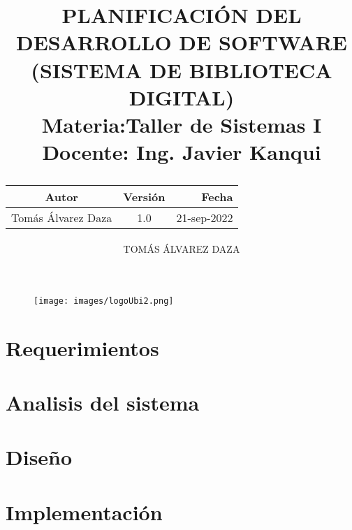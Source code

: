 \documentclass[10pt,letterpaper]{report}
\author{TOMÁS ÁLVAREZ DAZA}
\begin{document}
\begin{titlepage}
	\begin{figure}
		\texttt{[image: images/logoUbi2.png]}
	\end{figure}
	\title{PLANIFICACIÓN DEL DESARROLLO DE SOFTWARE\\
	(SISTEMA DE BIBLIOTECA DIGITAL)\\
	Materia:Taller de Sistemas I\\ 
	Docente: Ing. Javier Kanqui\\
	\vspace{1cm}

 \begin{tabular}{c|c|r}
	\hline
	Autor & Versión & Fecha \\
	\hline
	Tomás Álvarez Daza & 1.0 & 21-sep-2022 \\
	\hline
	\end{tabular}}
	
\end{titlepage}
\maketitle

\tableofcontents


%

\part{Requerimientos}
%
%


\part{Analisis del sistema} %



\part{Diseño}




\part{Implementación}%











%





%

\appendix
%


\end{document}
